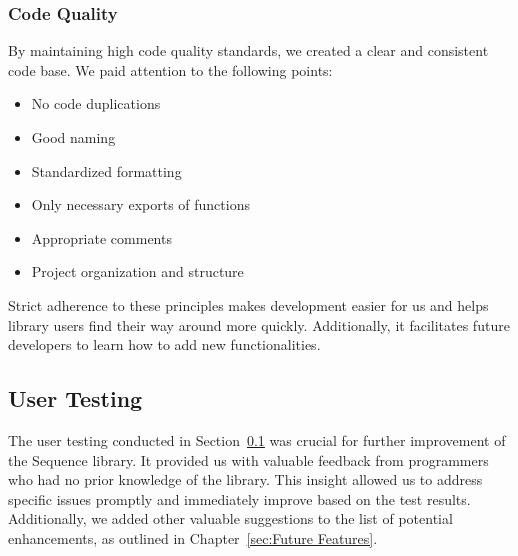 \subsubsection{Code Quality}
\label{subsub:Code Quality}
By maintaining high code quality standards, we created a clear and consistent
code base. We paid attention to the following points:

\begin{itemize}
  \item{No code duplications}
  \item{Good naming}
  \item{Standardized formatting}
  \item{Only necessary exports of functions}
  \item{Appropriate comments}
  \item{Project organization and structure}
\end{itemize}

Strict adherence to these principles makes development easier for us and helps
library users find their way around more quickly. Additionally, it facilitates
future developers to learn how to add new functionalities.

\subsection{User Testing}
\label{sub:User Testing}
The user testing conducted in Section~\ref{sub:User Testing} was crucial for further improvement
of the Sequence library. It provided us with valuable feedback from programmers
who had no prior knowledge of the library. This insight allowed us to address
specific issues promptly and immediately improve based on the test results.
Additionally, we added other valuable suggestions to the list of potential
enhancements, as outlined in Chapter~\ref{sec:Future Features}.
